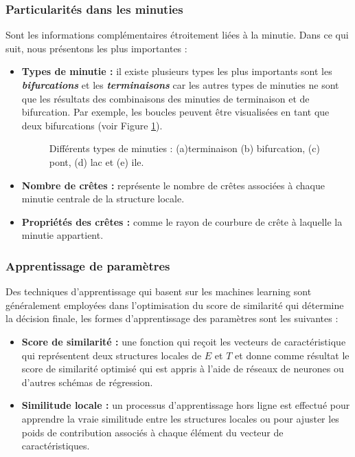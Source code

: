\subsubsection{Particularités dans les minuties}
Sont les informations complémentaires étroitement liées à la minutie. Dans ce qui suit, nous présentons les plus importantes :
\begin{itemize}
	\item \textbf{Types de minutie :} il existe plusieurs types les plus importants sont les \textit{\textbf{bifurcations}} et les \textit{\textbf{terminaisons}} car les autres types de minuties ne sont que les résultats des combinaisons des minuties de terminaison et de bifurcation. Par exemple, les boucles peuvent être visualisées en tant que deux bifurcations (voir  Figure \ref{fig:chapitre2types}). 
		\begin{center}
		\begin{figure}[H]
			\centering
			\caption{Différents types de minuties : (a)terminaison (b) bifurcation, (c) pont, (d) lac et (e) ile.}
			\label{fig:chapitre2types}
		\end{figure}
	\end{center}
\item\textbf{Nombre de crêtes :} représente le nombre de crêtes associées à chaque minutie centrale de la structure locale.
\item \textbf{Propriétés des crêtes :} comme le rayon de courbure de crête à laquelle la minutie appartient.
\end{itemize}
\subsubsection{Apprentissage de paramètres }
Des techniques d’apprentissage qui basent sur les machines learning sont généralement employées dans l'optimisation du score de similarité qui détermine la décision finale, les formes d'apprentissage des paramètres sont les suivantes :
\begin{itemize}
	\item \textbf{Score de similarité :} une fonction qui reçoit les vecteurs de caractéristique qui représentent deux structures locales de $ E $ et $ T $ et donne comme résultat le score de similarité optimisé qui est appris à l'aide de réseaux de neurones ou d'autres schémas de régression.
	\item \textbf{Similitude locale :} un processus d'apprentissage hors ligne est effectué pour apprendre la vraie similitude entre les structures locales ou pour ajuster les poids de contribution associés à chaque élément du vecteur de caractéristiques.	
\end{itemize}
